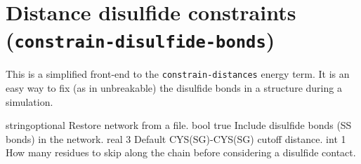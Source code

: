 \section{Distance disulfide constraints\\(\texttt{constrain-disulfide-bonds})}
\label{sec:constr-dist-ss-term}

This is a simplified front-end to the \texttt{constrain-distances}
energy term. It is an easy way to fix (as in unbreakable) the disulfide bonds in a
structure during a simulation.

\begin{optiontable}
  		{string}{optional} {Restore network from a file.}
  		{bool}	{true} {Include disulfide bonds (SS bonds) in the network.}
  			{real}	{3} {Default CYS(SG)-CYS(SG) cutoff distance.}
  				{int}	{1} {How many residues to skip along the chain before considering a disulfide contact.}
\end{optiontable}

